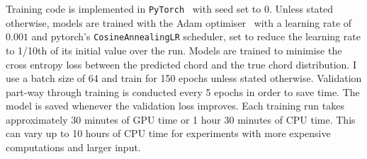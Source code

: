 Training code is implemented in \texttt{PyTorch}~\citep{pytorch} with seed set to $0$. Unless stated otherwise, models are trained with the Adam optimiser~\citep{adam} with a learning rate of $0.001$ and pytorch's \texttt{CosineAnnealingLR} scheduler, set to reduce the learning rate to 1/10th of its initial value over the run. Models are trained to minimise the cross entropy loss between the predicted chord and the true chord distribution. I use a batch size of 64 and train for 150 epochs unless stated otherwise. Validation part-way through training is conducted every 5 epochs in order to save time. The model is saved whenever the validation loss improves. Each training run takes approximately 30 minutes of GPU time or 1 hour 30 minutes of CPU time. This can vary up to 10 hours of CPU time for experiments with more expensive computations and larger input.